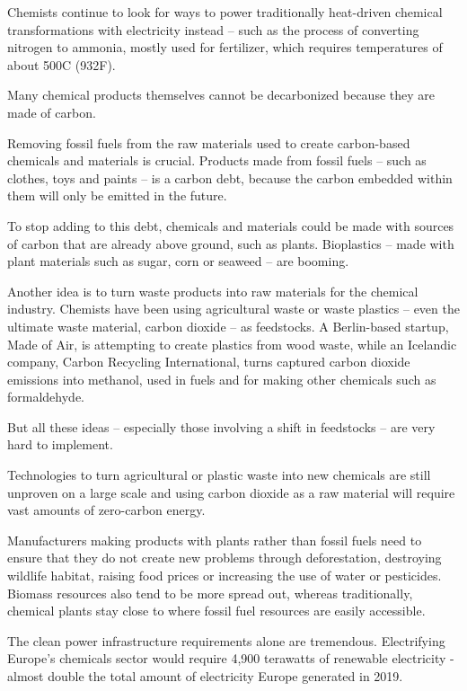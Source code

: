 \documentclass[
]{book}
\begin{document}
Chemists continue to look for ways to power traditionally heat-driven chemical transformations with electricity instead -- such as the process of converting nitrogen to ammonia, mostly used for fertilizer, which requires temperatures of about 500C (932F).

Many chemical products themselves cannot be decarbonized because they are made of carbon.

Removing fossil fuels from the raw materials used to create carbon-based chemicals and materials is crucial. Products made from fossil fuels -- such as clothes, toys and paints -- is a carbon debt, because the carbon embedded within them will only be emitted in the future.

To stop adding to this debt, chemicals and materials could be made with sources of carbon that are already above ground, such as plants. Bioplastics -- made with plant materials such as sugar, corn or seaweed -- are booming.

Another idea is to turn waste products into raw materials for the chemical industry. Chemists have been using agricultural waste or waste plastics -- even the ultimate waste material, carbon dioxide -- as feedstocks. A Berlin-based startup, Made of Air, is attempting to create plastics from wood waste, while an Icelandic company, Carbon Recycling International, turns captured carbon dioxide emissions into methanol, used in fuels and for making other chemicals such as formaldehyde.

But all these ideas -- especially those involving a shift in feedstocks -- are very hard to implement.

Technologies to turn agricultural or plastic waste into new chemicals are still unproven on a large scale and using carbon dioxide as a raw material will require vast amounts of zero-carbon energy.

Manufacturers making products with plants rather than fossil fuels need to ensure that they do not create new problems through deforestation, destroying wildlife habitat, raising food prices or increasing the use of water or pesticides. Biomass resources also tend to be more spread out, whereas traditionally, chemical plants stay close to where fossil fuel resources are easily accessible.

The clean power infrastructure requirements alone are tremendous. Electrifying Europe's chemicals sector would require 4,900 terawatts of renewable electricity - almost double the total amount of electricity Europe generated in 2019.
\end{document}
